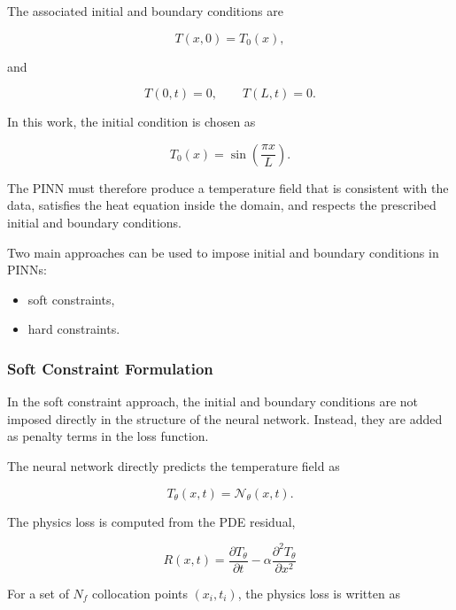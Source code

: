 The associated initial and boundary conditions are

\begin{equation}
T(x,0) = T_0(x),
\end{equation}

and

\begin{equation}
T(0,t)=0,
\qquad
T(L,t)=0.
\end{equation}

In this work, the initial condition is chosen as

\begin{equation}
T_0(x) = \sin\left(\frac{\pi x}{L}\right).
\end{equation}

The PINN must therefore produce a temperature field that is consistent with the data, satisfies the heat equation inside the domain, and respects the prescribed initial and boundary conditions.

Two main approaches can be used to impose initial and boundary conditions in PINNs:

\begin{itemize}
\item soft constraints,
\item hard constraints.
\end{itemize}

\subsubsection{Soft Constraint Formulation}

In the soft constraint approach, the initial and boundary conditions are not imposed directly in the structure of the neural network. Instead, they are added as penalty terms in the loss function.

The neural network directly predicts the temperature field as

\begin{equation}
T_{\theta}(x,t) = \mathcal{N}_{\theta}(x,t).
\end{equation}

The physics loss is computed from the PDE residual,

\begin{equation}
R(x,t) =  \frac{\partial T_{\theta}}{\partial t} - \alpha
\frac{\partial^2 T_{\theta}}{\partial x^2}
\end{equation}

For a set of $N_f$ collocation points $(x_i,t_i)$, the physics loss is written as

